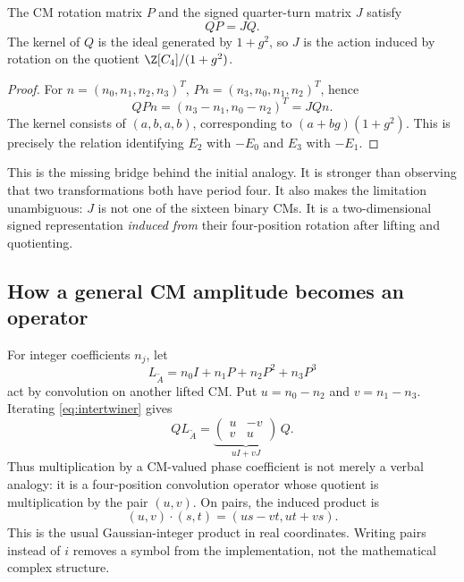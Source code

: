 \begin{theorem}\label{thm:intertwiner}
The CM rotation matrix $P$ and the signed quarter-turn matrix $J$ satisfy
\begin{equation}\label{eq:intertwiner}
 QP=JQ.
\end{equation}
The kernel of $Q$ is the ideal generated by $1+g^2$, so $J$ is the action induced by rotation on the quotient $\Z[C_4]/(1+g^2)$.
\end{theorem}
\begin{proof}
For $n=(n_0,n_1,n_2,n_3)^T$, $Pn=(n_3,n_0,n_1,n_2)^T$, hence
\begin{equation}
 QPn=(n_3-n_1,n_0-n_2)^T=JQn.
\end{equation}
The kernel consists of $(a,b,a,b)$, corresponding to $(a+bg)(1+g^2)$. This is precisely the relation identifying $E_2$ with $-E_0$ and $E_3$ with $-E_1$.
\end{proof}
This is the missing bridge behind the initial analogy. It is stronger than observing that two transformations both have period four. It also makes the limitation unambiguous: $J$ is not one of the sixteen binary CMs. It is a two-dimensional signed representation \emph{induced from} their four-position rotation after lifting and quotienting.

\subsection{How a general CM amplitude becomes an operator}
For integer coefficients $n_j$, let
\begin{equation}
 L_{\widetilde A}=n_0I+n_1P+n_2P^2+n_3P^3
\end{equation}
act by convolution on another lifted CM. Put $u=n_0-n_2$ and $v=n_1-n_3$. Iterating \cref{eq:intertwiner} gives
\begin{equation}\label{eq:operatorbridge}
 QL_{\widetilde A}=
 \underbrace{\begin{pmatrix}u&-v\\v&u\end{pmatrix}}_{uI+vJ}\,Q.
\end{equation}
Thus multiplication by a CM-valued phase coefficient is not merely a verbal analogy: it is a four-position convolution operator whose quotient is multiplication by the pair $(u,v)$. On pairs, the induced product is
\begin{equation}
 (u,v)\cdot(s,t)=(us-vt,ut+vs).
\end{equation}
This is the usual Gaussian-integer product in real coordinates. Writing pairs instead of $i$ removes a symbol from the implementation, not the mathematical complex structure.

